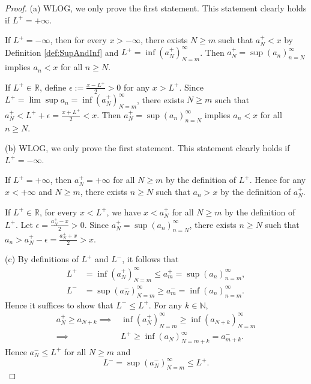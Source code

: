 \begin{proof}
  (a) WLOG, we only prove the first statement.
  This statement clearly holds if $L^{+}=+\infty$.
  
  If $L^{+}=-\infty$, then for every $x>-\infty$, 
  there exists $N\ge m$ such that  $a_{N}^{+}<x$
  by Definition \ref{def:SupAndInf}
  and $L^{+}=\inf(a_{N}^{+})_{N=m}^{\infty}$.
  Then $a_{N}^{+}=\sup(a_{n})_{n=N}^{\infty}$ implies
  $a_{n}<x$ for all $n\ge N$. 
  
  If $L^{+}\in \mathbb{R}$,
  define $\epsilon:=\frac{x-L^{+}}{2}>0$ for any $x>L^{+}$. 
  Since $L^{+}=\lim \sup a_{n}=\inf(a_{N}^{+})_{N=m}^{\infty}$,
  there exists $N\ge m$ such that
  $a_{N}^{+}<L^{+}+\epsilon=\frac{x+L^{+}}{2}<x$.
  Then $a_{N}^{+}=\sup(a_{n})_{n=N}^{\infty}$ implies
  $a_{n}<x$ for all $n\ge N$.

  (b) WLOG, we only prove the first statement.
  This statement clearly holds if $L^{+}=-\infty$.
  
  If $L^{+}=+\infty$, then $a_{N}^{+}=+\infty$ for all $N\ge m$
  by the definition of $L^{+}$.
  Hence for any $x<+\infty$ and $N\ge m$,
  there exists $n\ge N$ such that
  $a_{n}>x$ by the definition of $a_{N}^{+}$.
  
  If $L^{+}\in \mathbb{R}$,
  for every $x<L^{+}$, we have $x<a_{N}^{+}$ for all $N\ge m$
  by the definition of $L^{+}$.
  Let $\epsilon=\frac{a_{N}^{+}-x}{2}>0$.
  Since $a_{N}^{+}=\sup(a_{n})_{n=N}^{\infty}$,
  there exists $n\ge N$ such that
  $a_{n}>a_{N}^{+}-\epsilon=\frac{a_{N}^{+}+x}{2}>x$.

  (c) By definitions of $L^{+}$ and $L^{-}$, it follows that
  \begin{align*}
    L^{+}&=\inf(a_{N}^{+})_{N=m}^{\infty}\le a_{m}^{+}
           =\sup(a_{n})_{n=m}^{\infty},\\
    L^{-}&=\sup(a_{N}^{-})_{N=m}^{\infty}\ge a_{m}^{-}
           =\inf(a_{n})_{n=m}^{\infty}.
  \end{align*}
  Hence it suffices to show that $L^{-}\le L^{+}$.
  For any $k\in\mathbb{N}$, 
  \begin{align*}
     a_{N}^{+}\ge a_{N+k}
    \implies
    & \inf(a_{N}^{+})_{N=m}^{\infty}
      \ge \inf(a_{N+k})_{N=m}^{\infty}
    \\ \implies
    & L^{+} \ge \inf(a_{N})_{N=m+k}^{\infty} = a_{m+k}^{-}.
  \end{align*}
  Hence $a_{N}^{-} \le L^{+}$ for all $N\ge m$ and
  \begin{displaymath}
    L^{-}=\sup(a_{N}^{-})_{N=m}^{\infty}\le L^{+}.
  \end{displaymath}


\end{proof}
